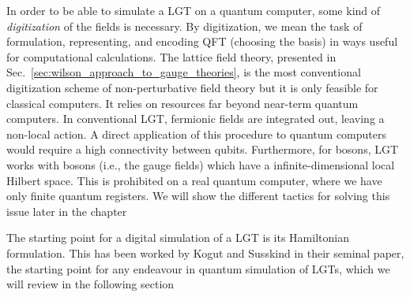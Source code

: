 In order to be able to simulate a LGT on a quantum computer, some kind of \emph{digitization} of the fields is necessary.
By digitization, we mean the task of formulation, representing, and encoding QFT (choosing the basis) in ways useful for computational calculations.
The lattice field theory, presented in Sec.~\ref{sec:wilson_approach_to_gauge_theories}, is the most conventional digitization scheme of non-perturbative field theory but it is only feasible for classical computers.
It relies on resources far beyond near-term quantum computers.
In conventional LGT, fermionic fields are integrated out, leaving a non-local action.
A direct application of this procedure to quantum computers would require a high connectivity between qubits.
Furthermore, for bosons, LGT works with bosons (i.e., the gauge fields) which have a infinite-dimensional local Hilbert space.
This is prohibited on a real quantum computer, where we have only finite quantum registers.
We will show the different tactics for solving this issue later in the chapter

The starting point for a digital simulation of a LGT is its Hamiltonian formulation.
This has been worked by Kogut and Susskind in their seminal paper\citneeded, the starting point for any endeavour in quantum simulation of LGTs, which we will review in the following section



